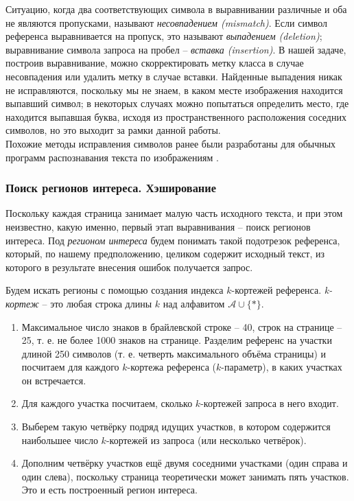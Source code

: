 \documentclass{main.tex}[subfiles]
\begin{document}
Ситуацию, когда два соответствующих символа в выравнивании различные и оба не являются пропусками, называют \emph{несовпадением (mismatch)}.
Если символ референса выравнивается на пропуск, это называют \emph{выпадением (deletion)}; выравнивание символа запроса на пробел -- \emph{вставка (insertion)}.
В нашей задаче, построив выравнивание, можно скорректировать метку класса в случае несовпадения или удалить метку в случае вставки.
Найденные выпадения никак не исправляются, поскольку мы не знаем, в каком месте изображения находится выпавший символ; в некоторых случаях можно попытаться определить место, где находится выпавшая буква, исходя из пространственного расположения соседних символов, но это выходит за рамки данной работы. \\

Похожие методы исправления символов ранее были разработаны для обычных программ распознавания текста по изображениям \cite{muller2021word_aln}.

\subsubsection{Поиск регионов интереса. Хэширование}


Поскольку каждая страница занимает малую часть исходного текста, и при этом неизвестно, какую именно, первый этап выравнивания -- поиск регионов интереса.
Под \emph{регионом интереса} будем понимать такой подотрезок референса, который, по нашему предположению, целиком содержит исходный текст, из которого в результате внесения ошибок получается запрос.

Будем искать регионы с помощью создания индекса $k$-кортежей референса.
\emph{k-кортеж} -- это любая строка длины $k$ над алфавитом $ \mathcal A  \cup \{ \ast \} $.

\begin{enumerate}[noitemsep]
    \item Максимальное число знаков в брайлевской строке -- 40, строк на странице -- 25, т. е. не более 1000 знаков на странице.
    Разделим референс на участки длиной 250 символов (т. е. четверть максимального объёма страницы) и посчитаем для каждого $k$-кортежа референса ($k$-параметр), в каких участках он встречается.
    \item Для каждого участка посчитаем, сколько $k$-кортежей запроса в него входит.
    \item Выберем такую четвёрку подряд идущих участков, в котором содержится наибольшее число $k$-кортежей из запроса (или несколько четвёрок).
    \item Дополним четвёрку участков ещё двумя соседними участками (один справа и один слева), поскольку страница теоретически может занимать пять участков.
    Это и есть построенный регион интереса.
 \end{enumerate}
\end{document}

